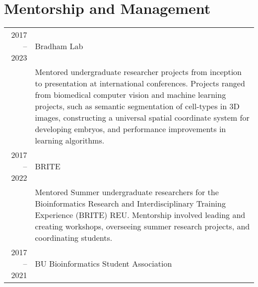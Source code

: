 \documentclass[a4paper,10pt]{report}
\begin{document}
\section{\color{linkcolour} Mentorship and Management}
\begin{longtable}{rp{11cm}}
	2017 -- 2023
	 & Bradham Lab                                                                                                                                                                                                                                                                                                                                                                                     \\
	 & \footnotesize{Mentored undergraduate researcher projects from inception to presentation at international conferences. Projects ranged from biomedical computer vision and machine learning projects, such as semantic segmentation of cell-types in 3D images, constructing a universal spatial coordinate system for developing embryos, and performance improvements in learning algorithms.} \\
	2017 -- 2022
	 & BRITE                                                                                                                                                                                                                                                                                                                                                                                           \\
	 & \footnotesize{Mentored Summer undergraduate researchers for the
		Bioinformatics Research and Interdisciplinary Training Experience (BRITE)
		REU. Mentorship involved leading and creating workshops, overseeing
	summer research projects, and coordinating students.}                                                                                                                                                                                                                                                                                                                                              \\
	2017 -- 2021
	 & BU Bioinformatics Student Association                                                                                                                                                                                                                                                                                                                                                           \\

\end{longtable}
\end{document}
